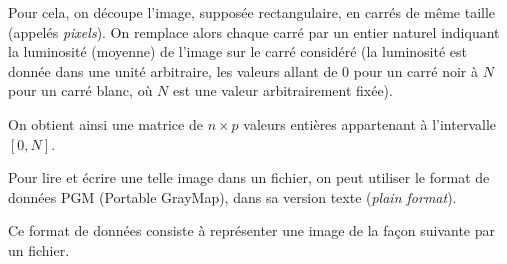 \medskip Pour cela, on découpe l'image, supposée
rectangulaire,  en carrés  de même  taille (appelés \emph{pixels}). On
remplace  alors chaque
carré  par un  entier  naturel indiquant  la  luminosité (moyenne)  de
l'image sur le carré considéré (la luminosité est donnée dans une
unité arbitraire, les valeurs allant de $0$ pour un carré noir à $N$
pour un carré blanc, où $N$ est une valeur arbitrairement fixée). 

On
obtient ainsi une matrice de $n\times p$ valeurs entières appartenant
à l'intervalle $[0, N]$.

\bigskip Pour lire et écrire une telle image dans un fichier, on peut utiliser
le format de données PGM (Portable GrayMap), dans sa version texte
(\textit{plain format}).

Ce format de données consiste à représenter une image de la façon
suivante par un fichier.
